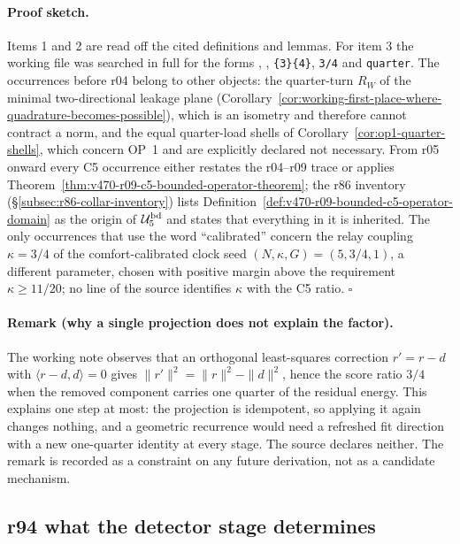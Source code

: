 \paragraph{Proof sketch.}
Items 1 and 2 are read off the cited definitions and lemmas.  For item 3 the working file was
searched in full for the forms \texttt{\string{}}, \texttt{\string{}},
\texttt{\string\frac\{3\}\{4\}}, \texttt{3/4} and \texttt{quarter}.  The occurrences before r04
belong to other objects: the quarter-turn \(R_W\) of the minimal two-directional leakage plane
(Corollary~\ref{cor:working-first-place-where-quadrature-becomes-possible}), which is an
isometry and therefore cannot contract a norm, and the equal quarter-load shells of
Corollary~\ref{cor:op1-quarter-shells}, which concern OP~1 and are explicitly declared not
necessary.  From r05 onward every C5 occurrence either restates the r04--r09 trace or applies
Theorem~\ref{thm:v470-r09-c5-bounded-operator-theorem}; the r86 inventory
(\S\ref{subsec:r86-collar-inventory}) lists Definition~\ref{def:v470-r09-bounded-c5-operator-domain}
as the origin of \(\mathcal U_5^{\rm bd}\) and states that everything in it is inherited.  The
only occurrences that use the word ``calibrated'' concern the relay coupling \(\kappa=3/4\) of
the comfort-calibrated clock seed \((N,\kappa,G)=(5,3/4,1)\), a different parameter, chosen with
positive margin above the requirement \(\kappa\ge11/20\); no line of the source identifies
\(\kappa\) with the C5 ratio.  \(\square\)

\paragraph{Remark (why a single projection does not explain the factor).}
The working note observes that an orthogonal least-squares correction \(r'=r-d\) with
\(\langle r-d,d\rangle=0\) gives \(\|r'\|^2=\|r\|^2-\|d\|^2\), hence the score ratio \(3/4\) when
the removed component carries one quarter of the residual energy.  This explains one step at
most: the projection is idempotent, so applying it again changes nothing, and a geometric
recurrence would need a refreshed fit direction with a new one-quarter identity at every stage.
The source declares neither.  The remark is recorded as a constraint on any future derivation,
not as a candidate mechanism.

\subsection*{r94 what the detector stage determines}
\label{subsec:r94-detector-stage-interval}

